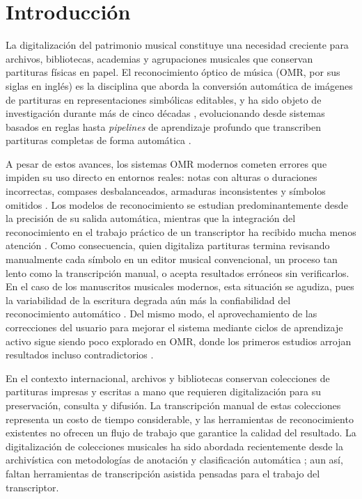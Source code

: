 \documentclass[conference]{IEEEtran}
\begin{document}
\section{Introducción}

La digitalización del patrimonio musical constituye una necesidad
creciente para archivos, bibliotecas, academias y agrupaciones musicales
que conservan partituras físicas en papel. El reconocimiento óptico de
música (OMR, por sus siglas en inglés) es la disciplina que aborda la
conversión automática de imágenes de partituras en representaciones
simbólicas editables, y ha sido objeto de investigación durante más de
cinco décadas \cite{omr2020}, evolucionando desde sistemas basados en
reglas hasta \emph{pipelines} de aprendizaje profundo que transcriben
partituras completas de forma automática
\cite{rebelo2012,calvo2018,riosvila2026}.

A pesar de estos avances, los sistemas OMR modernos cometen errores que
impiden su uso directo en entornos reales: notas con alturas o duraciones
incorrectas, compases desbalanceados, armaduras inconsistentes y símbolos
omitidos \cite{calvo2018}. Los modelos de reconocimiento se estudian
predominantemente desde la precisión de su salida automática, mientras
que la integración del reconocimiento en el trabajo práctico de un
transcriptor ha recibido mucha menos atención \cite{rizo2023}. Como
consecuencia, quien digitaliza partituras termina revisando manualmente
cada símbolo en un editor musical convencional, un proceso tan lento como
la transcripción manual, o acepta resultados erróneos sin verificarlos.
En el caso de los manuscritos musicales modernos, esta situación se
agudiza, pues la variabilidad de la escritura degrada aún más la
confiabilidad del reconocimiento automático \cite{ricordi2024}. Del mismo
modo, el aprovechamiento de las correcciones del usuario para mejorar el
sistema mediante ciclos de aprendizaje activo sigue siendo poco explorado
en OMR, donde los primeros estudios arrojan resultados incluso
contradictorios \cite{mlsp2025}.

En el contexto internacional, archivos y bibliotecas conservan colecciones
de partituras impresas y escritas a mano que requieren digitalización para
su preservación, consulta y difusión. La transcripción manual de estas
colecciones representa un costo de tiempo considerable, y las herramientas
de reconocimiento existentes no ofrecen un flujo de trabajo que garantice
la calidad del resultado. La digitalización de colecciones musicales ha
sido abordada recientemente desde la archivística con metodologías de
anotación y clasificación automática \cite{ricordi2024}; aun así,
faltan herramientas de transcripción asistida pensadas para el trabajo
del transcriptor.
\end{document}
